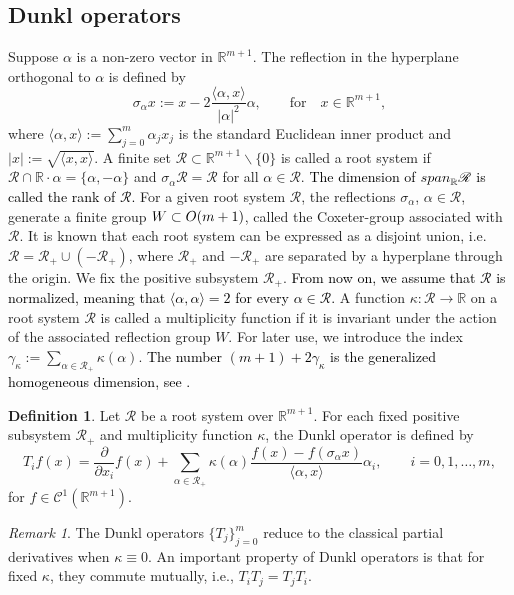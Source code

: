 \documentclass{amsart}
\theoremstyle{definition}
\newtheorem{definition}[theorem]{Definition}
\theoremstyle{remark}
\newtheorem{remark}[theorem]{Remark}
\numberwithin{equation}{section}
\begin{document}
\subsection{Dunkl operators}
Suppose $\alpha$ is a non-zero vector in $\mathbb{R}^{m+1}$. The reflection in the hyperplane orthogonal to $\alpha$ is defined by
\begin{equation*}
    \sigma_{\alpha} x:=x-2\frac{\langle \alpha, x\rangle}{|\alpha|^{2}}\alpha, \qquad  \mbox{for} \quad  x\in \mathbb{R}^{m+1},
\end{equation*}
where $\langle \alpha, x\rangle:=\sum_{j=0}^{m}\alpha_{j}x_{j}$ is the standard Euclidean inner product and $|x|:=\sqrt{\langle x, x\rangle}$.
A finite set $\mathscr{R}\subset \mathbb{R}^{m+1}\backslash\{0\}$ is called a root system if $\mathscr{R}\cap \mathbb{R}\cdot \alpha=\{\alpha, -\alpha\}$
and $\sigma_{\alpha} \mathscr{R}=\mathscr{R}$ for all $\alpha\in \mathscr{R}$. \textcolor{black}{ The dimension of ${\rm span}_{\mathbb{R}}\mathscr{R}$ is called the rank of $\mathscr{R}$.} For a given root system $\mathscr{R}$, the reflections $\sigma_{\alpha}$, $\alpha\in \mathscr{R}$, generate a finite group $W\subset {\rm O}(m+1)$, called the Coxeter-group associated with $\mathscr{R}$. It is known that each root system can be expressed  as a disjoint union, i.e. $\mathscr{R}=\mathscr{R}_{+}\cup (-\mathscr{R}_{+})$, where $\mathscr{R}_{+}$ and $-\mathscr{R}_{+}$ are separated by a hyperplane through the origin. We fix the positive subsystem $\mathscr{R}_{+}$. \textcolor{black}{From now on, we assume that $\mathscr{R}$ is normalized, meaning that $\langle \alpha, \alpha\rangle=2$ for every $\alpha\in \mathscr{R}$.} A function $\kappa: \mathscr{R}\rightarrow \mathbb{R}$ on a root system $\mathscr{R}$ is called a multiplicity function if it is invariant under the action of the associated reflection group $W$. For later use, we introduce the index $\gamma_{\kappa}:=\sum_{\alpha\in \mathscr{R}_{+}}\kappa(\alpha).$ \textcolor{black}{ The number $(m+1)+2\gamma_{\kappa}$ is  the generalized homogeneous dimension, see \cite{dx1}.}
\begin{definition} \cite{dun}
Let $\mathscr{R}$ be a root system over $\mathbb{R}^{m+1}$. For each fixed positive subsystem $\mathscr{R}_{+}$ and multiplicity function $\kappa$, the  Dunkl operator is defined by
\begin{equation*}
    T_{i}f(x)=\frac{\partial}{\partial x_{i}} f(x)+\sum_{\alpha\in \mathscr{R}_{+}}\kappa(\alpha)\frac{f(x)-f(\sigma_{\alpha }x)}{\langle \alpha, x\rangle}\alpha_{i}, \qquad i=0,1,\ldots, m,
\end{equation*}
for $f\in \mathcal{C}^{1}(\mathbb{R}^{m+1})$.
\end{definition}
\begin{remark} The Dunkl operators $\{T_{j}\}_{j=0}^{m}$ reduce to the classical partial derivatives when $\kappa\equiv 0$.  An important property of Dunkl operators is that for fixed $\kappa$, they commute mutually, i.e., $T_{i}T_{j}=T_{j}T_{i}$.
\end{remark}
\end{document}
